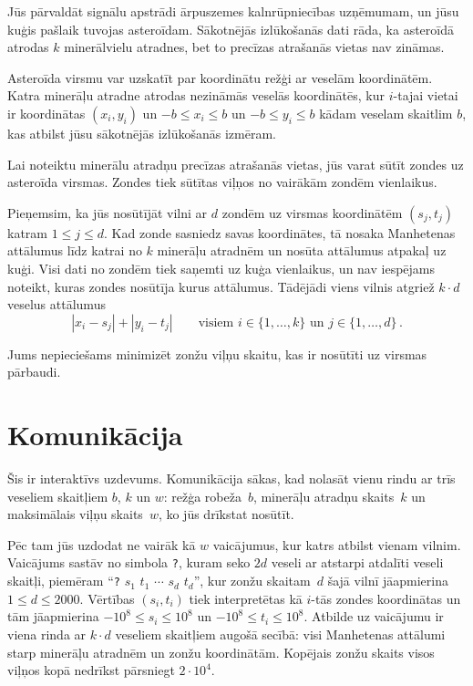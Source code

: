 

\noindent
Jūs pārvaldāt signālu apstrādi ārpuszemes kalnrūpniecības uzņēmumam, un jūsu kuģis pašlaik tuvojas asteroīdam. Sākotnējās izlūkošanās dati rāda, ka asteroīdā atrodas $k$ minerālvielu atradnes, bet to precīzas atrašanās vietas nav zināmas.

\medskip

Asteroīda virsmu var uzskatīt par koordinātu režģi ar veselām koordinātēm.
Katra minerāļu atradne atrodas nezināmās veselās koordinātēs, kur $i$-tajai vietai ir koordinātas $(x_i, y_i)$ un
$-b \le x_i \le b$ un $-b\le y_i \le b$ %
kādam veselam skaitlim $b$, kas atbilst jūsu sākotnējās  izlūkošanās izmēram.

Lai noteiktu minerālu atradņu precīzas atrašanās vietas, jūs varat sūtīt zondes uz asteroīda virsmas.
Zondes tiek sūtītas viļņos no vairākām zondēm vienlaikus.

Pieņemsim, ka jūs nosūtījāt vilni ar $d$ zondēm uz virsmas koordinātēm $(s_j, t_j)$ katram $1\leq j\leq d$.
Kad zonde sasniedz savas koordinātes, tā nosaka Manhetenas attālumus līdz katrai no $k$ minerāļu atradnēm un nosūta attālumus atpakaļ uz kuģi.
Visi dati no zondēm tiek saņemti uz kuģa vienlaikus, un nav iespējams noteikt, kuras zondes nosūtīja kurus attālumus.
Tādējādi viens vilnis atgriež $k\cdot d$ veselus attālumus
\[|x_i-s_j| + |y_i - t_j| \qquad\text{visiem } i \in \{1,\ldots,k\} \text{ un } j \in\{ 1,\ldots,d\}\,.\]

Jums nepieciešams minimizēt zonžu viļņu skaitu, kas ir nosūtīti uz virsmas pārbaudi.


\section*{Komunikācija}

Šis ir interaktīvs uzdevums.
Komunikācija sākas, kad nolasāt vienu rindu ar trīs veseliem skaitļiem $b$, $k$ un $w$:
režģa robeža~$b$,
minerāļu atradņu skaits~$k$
un maksimālais viļņu skaits~$w$, ko jūs drīkstat nosūtīt.

Pēc tam jūs uzdodat ne vairāk kā $w$ vaicājumus, kur katrs atbilst vienam vilnim.
Vaicājums sastāv no simbola \texttt{?}, kuram seko $2d$ veseli ar atstarpi atdalīti veseli skaitļi, piemēram ``\texttt{?} $s_1$ $t_1$ $\cdots$ $s_d$ $t_d$'', kur zonžu skaitam~$d$ šajā vilnī jāapmierina
$1\leq d\leq 2000$. %
Vērtības $(s_i, t_i)$ tiek interpretētas kā $i$-tās zondes koordinātas un tām jāapmierina
$-10^8 \leq s_i \leq 10^8$ un $-10^8 \leq t_i \leq 10^8$. %
Atbilde uz vaicājumu ir viena rinda ar $k \cdot d$ veseliem skaitļiem augošā secībā: visi Manhetenas attālumi starp minerāļu atradnēm un zonžu koordinātām.
Kopējais zonžu skaits visos viļņos kopā nedrīkst pārsniegt
$2\cdot 10^4$. %

